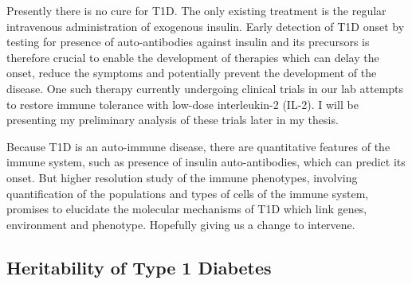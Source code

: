 Presently there is no cure for T1D.
The only existing treatment is the regular intravenous administration of exogenous insulin.  
Early detection of T1D onset by
testing for presence of auto-antibodies against insulin and its precursors
is therefore crucial to enable the development of therapies which can delay the onset, reduce the symptoms and potentially prevent the development of the disease.
One such therapy currently undergoing clinical trials in our lab attempts to restore immune tolerance with low-dose interleukin-2 (IL-2).
I will be presenting my preliminary analysis of these trials later in my thesis.


Because T1D is an auto-immune disease, there are quantitative features of the immune system, such as presence of insulin auto-antibodies, which can predict its onset.
But higher resolution study of the immune phenotypes, involving quantification of the populations and types of cells of the immune system,
promises to elucidate the molecular mechanisms of T1D which link genes, environment and phenotype.
Hopefully giving us a change to intervene.



\subsection{Heritability of Type 1 Diabetes}


